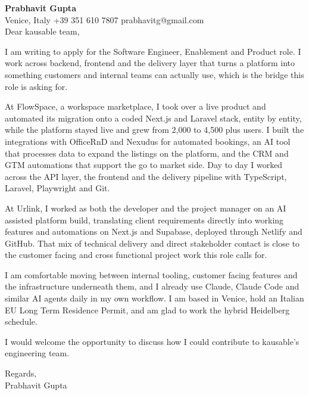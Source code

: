 \documentclass[a4paper,10.5pt]{article}
\begin{document}
\textbf{Prabhavit Gupta}\\
Venice, Italy \textbar{} +39 351 610 7807 \textbar{} prabhavitg@gmail.com\\[10pt]
Dear kausable team,

I am writing to apply for the Software Engineer, Enablement and Product role. I work across backend, frontend and the delivery layer that turns a platform into something customers and internal teams can actually use, which is the bridge this role is asking for.

At FlowSpace, a workspace marketplace, I took over a live product and automated its migration onto a coded Next.js and Laravel stack, entity by entity, while the platform stayed live and grew from 2,000 to 4,500 plus users. I built the integrations with OfficeRnD and Nexudus for automated bookings, an AI tool that processes data to expand the listings on the platform, and the CRM and GTM automations that support the go to market side. Day to day I worked across the API layer, the frontend and the delivery pipeline with TypeScript, Laravel, Playwright and Git.

At Urlink, I worked as both the developer and the project manager on an AI assisted platform build, translating client requirements directly into working features and automations on Next.js and Supabase, deployed through Netlify and GitHub. That mix of technical delivery and direct stakeholder contact is close to the customer facing and cross functional project work this role calls for.

I am comfortable moving between internal tooling, customer facing features and the infrastructure underneath them, and I already use Claude, Claude Code and similar AI agents daily in my own workflow. I am based in Venice, hold an Italian EU Long Term Residence Permit, and am glad to work the hybrid Heidelberg schedule.

I would welcome the opportunity to discuss how I could contribute to kausable's engineering team.

Regards,\\
Prabhavit Gupta
\end{document}
